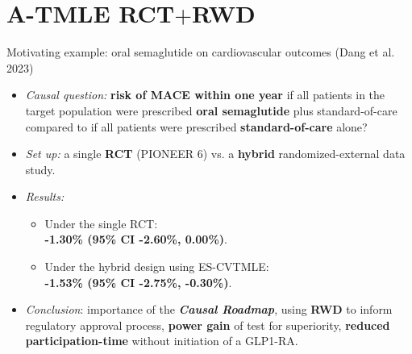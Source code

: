 \documentclass[t]{beamer}
\begin{document}
\section{A-TMLE RCT$+$RWD}
\begin{frame}{Motivating example: oral semaglutide on cardiovascular outcomes (Dang et al. 2023)}
\small
\begin{itemize}
\item \textit{Causal question:} \textbf{risk of MACE within one year} if all patients in the target population were prescribed \textbf{oral semaglutide} plus standard-of-care compared to if all patients were prescribed \textbf{standard-of-care} alone?
\item \textit{Set up:} a single \textbf{RCT} (PIONEER 6) vs. a \textbf{hybrid} randomized-external data study.
\item \textit{Results:} 
\begin{itemize}
\item Under the single RCT: \\ \textbf{-1.30\% (95\% CI -2.60\%, 0.00\%)}. 
\item Under the hybrid design using ES-CVTMLE: \\ \textbf{-1.53\% (95\% CI -2.75\%, -0.30\%)}.
\end{itemize}
\item \textit{Conclusion}: importance of the \textbf{\textit{Causal Roadmap}}, using \textbf{RWD} to inform regulatory approval process, \textbf{power gain} of test for superiority, \textbf{reduced participation-time} without initiation of a GLP1-RA.
\end{itemize}
\end{frame}


\end{document}
